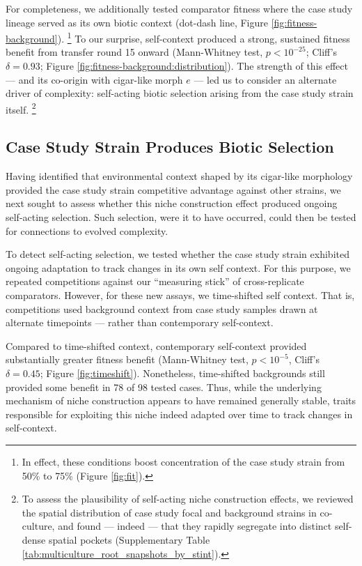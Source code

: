 For completeness, we additionally tested comparator fitness where the case study lineage served as its own biotic context (dot-dash line, Figure \ref{fig:fitness-background}).
\unskip\footnote{%
In effect, these conditions boost concentration of the case study strain from 50\% to 75\% (Figure \ref{fig:fit}).
}
To our surprise, self-context produced a strong, sustained fitness benefit from transfer round 15 onward (Mann-Whitney test, $p < 10^{-25}$; Cliff's $\delta=0.93$; Figure \ref{fig:fitness-background:distribution}).
The strength of this effect --- and its co-origin with cigar-like morph $e$ --- led us to consider an alternate driver of complexity: self-acting biotic selection arising from the case study strain itself.
\unskip\footnote{%
To assess the plausibility of self-acting niche construction effects, we reviewed the spatial distribution of case study focal and background strains in co-culture, and found --- indeed --- that they rapidly segregate into distinct self-dense spatial pockets (Supplementary Table \ref{tab:multiculture_root_snapshots_by_stint}).
}

\subsection{Case Study Strain Produces Biotic Selection}
\label{sec:case-study-strain-produces-biotic-selection}



Having identified that environmental context shaped by its cigar-like morphology provided the case study strain competitive advantage against other strains, we next sought to assess whether this niche construction effect produced ongoing self-acting selection.
Such selection, were it to have occurred, could then be tested for connections to evolved complexity.

To detect self-acting selection, we tested whether the case study strain exhibited ongoing adaptation to track changes in its own self context.
For this purpose, we repeated competitions against our ``measuring stick'' of cross-replicate comparators.
However, for these new assays, we time-shifted self context.
That is, competitions used background context from case study samples drawn at alternate timepoints --- rather than contemporary self-context.

Compared to time-shifted context, contemporary self-context provided substantially greater fitness benefit (Mann-Whitney test, $p<10^{-5}$, Cliff's $\delta=0.45$; Figure \ref{fig:timeshift}).
Nonetheless, time-shifted backgrounds still provided some benefit in 78 of 98 tested cases.
Thus, while the underlying mechanism of niche construction appears to have remained generally stable, traits responsible for exploiting this niche indeed adapted over time to track changes in self-context.

